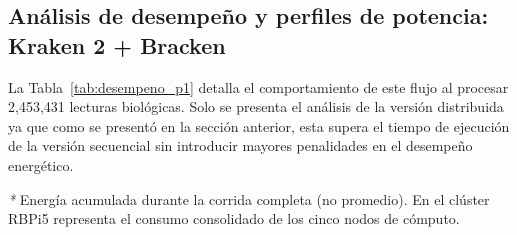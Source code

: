 \documentclass[12pt,oneside,spanish]{book}
\begin{document}
    
    
    
    \subsection{Análisis de desempeño y perfiles de potencia: Kraken 2 + Bracken}
    
    La Tabla~\ref{tab:desempeno_p1} detalla el comportamiento de este flujo al procesar 2,453,431 lecturas biológicas. Solo se presenta el análisis de la versión distribuida ya que como se presentó en la sección anterior, esta supera el tiempo de ejecución de la versión secuencial sin introducir mayores penalidades en el desempeño energético.
    
    \begin{table}[htbp]
    \centering
    \caption{Métricas de desempeño computacional y energético: Kraken 2 + Bracken (5 muestras, 2,453,431 lecturas, protocolo 5~min de reposo basal).}
    \label{tab:desempeno_p1}
    \footnotesize
    \setlength{\tabcolsep}{4.5pt}
    \vspace{1.5mm}
    \parbox{\textwidth}{\raggedright \footnotesize \textit{*} Energía acumulada durante la corrida completa (no promedio). En el clúster RBPi5 representa el consumo consolidado de los cinco nodos de cómputo.}
    \end{table}
    
\end{document}
